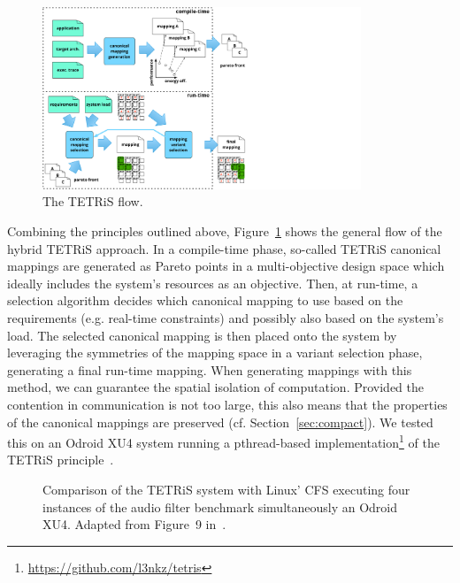 \begin{figure}[th]
	\centering
	\includegraphics[width=0.85\textwidth]{figures/tetris_flow.pdf}
	\caption{The \ac{TETRiS} flow.}
	\label{fig:tetris_flow}
\end{figure}

Combining the principles outlined above, Figure~\ref{fig:tetris_flow} shows the general flow of the hybrid \ac{TETRiS} approach. 
In a compile-time phase, so-called \ac{TETRiS} canonical mappings are generated as Pareto points in a multi-objective design space which ideally includes the system's resources as an objective.
Then, at run-time, a selection algorithm decides which canonical mapping to use based on the requirements (e.g. real-time constraints) and possibly also based on the system's load.
The selected canonical mapping is then placed onto the system by leveraging the symmetries of the mapping space in a variant selection phase, generating a final run-time mapping.
When generating mappings with this method, we can guarantee the spatial isolation of computation.
Provided the contention in communication is not too large, this also means that the properties of the canonical mappings are preserved (cf. Section~\ref{sec:compact}).
We tested this on an Odroid XU4 system running a pthread-based implementation\footnote{\url{https://github.com/l3nkz/tetris}} of the \ac{TETRiS} principle~\cite{goens_scopes17}.

\begin{figure}[th]
	\centering
	\caption{Comparison of the TETRiS system with Linux' \acs*{CFS} executing four instances of the audio filter benchmark simultaneously an Odroid XU4. Adapted from Figure~9 in~\cite{goens_scopes17}.}
	\label{fig:tetris_experiment}
\end{figure}


